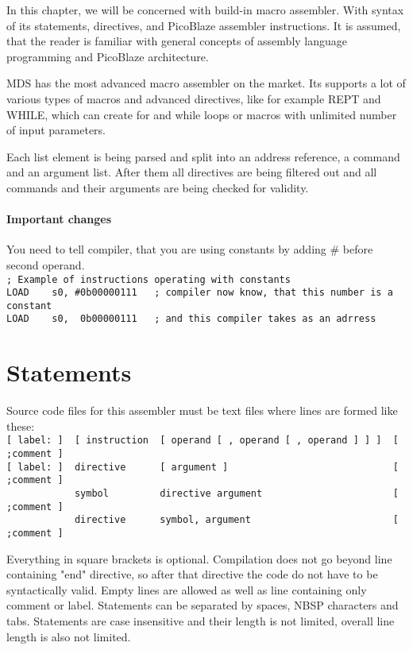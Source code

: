 In this chapter, we will be concerned with build-in macro assembler. With syntax of its statements, directives, and PicoBlaze assembler instructions. It is assumed, that the reader is familiar with general concepts of assembly language programming and PicoBlaze architecture.

MDS has the most advanced macro assembler on the market. Its supports a lot of various types of macros and advanced directives, like for example REPT and WHILE, which can create for and while loops or  macros with unlimited number of input parameters.

Each list element is being parsed and split into an address reference, a command and an argument list. After them all directives are being filtered out and all commands and their arguments are being checked for validity.

\paragraph{Important changes}
    You need to tell compiler, that you are using constants by adding \# before second operand.\\
    {
        \usecodefont
        \verb'; Example of instructions operating with constants'\\
        \verb'LOAD    s0, #0b00000111   ; compiler now know, that this number is a constant'\\
        \verb'LOAD    s0,  0b00000111   ; and this compiler takes as an adrress'
    }

\section{Statements}
    Source code files for this assembler must be text files where lines are formed like these:\\
    {
        \usecodefont
        \verb'[ label: ]  [ instruction  [ operand [ , operand [ , operand ] ] ]  [ ;comment ]'\\
        \verb'[ label: ]  directive      [ argument ]                             [ ;comment ]'\\
        \verb'            symbol         directive argument                       [ ;comment ]'\\
        \verb'            directive      symbol, argument                         [ ;comment ]'
    }

    Everything in square brackets is optional. Compilation does not go beyond line containing "end" directive, so after that directive the code do not have to be syntactically valid. Empty lines are allowed as well as line containing only comment or label. Statements can be separated by spaces, NBSP characters and tabs. Statements are case insensitive and their length is not limited, overall line length is also not limited.

